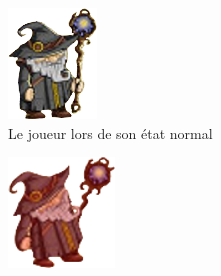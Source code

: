     \FloatBarrier
    \begin{figure}[ht]
        \centering
        \begin{subfigure}[t]{0.45\textwidth}
            \centering
            \includegraphics[width=\textwidth]{image/feedback/feedback1.png}
            \caption{Le joueur lors de son état normal}
        \end{subfigure}
        \begin{subfigure}[t]{0.45\textwidth}
            \centering
            \includegraphics[width=\textwidth]{image/feedback/feedback2.png}

\end{subfigure}
\end{figure}
